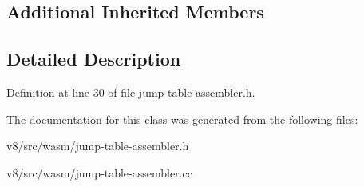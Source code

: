\subsection*{Additional Inherited Members}


\subsection{Detailed Description}


Definition at line 30 of file jump-\/table-\/assembler.\+h.



The documentation for this class was generated from the following files\+:\begin{DoxyCompactItemize}
\item 
v8/src/wasm/jump-\/table-\/assembler.\+h\item 
v8/src/wasm/jump-\/table-\/assembler.\+cc\end{DoxyCompactItemize}
